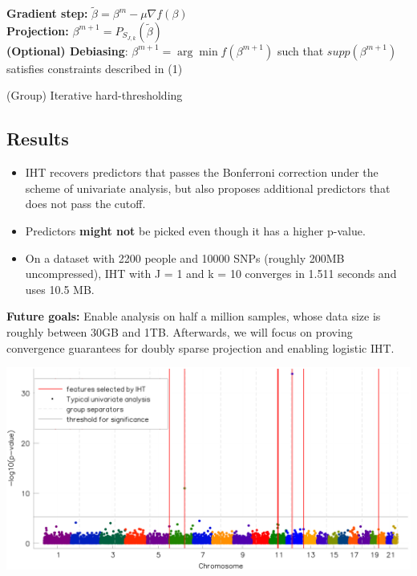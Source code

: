 \documentclass[a0,portrait]{a0poster}
\begin{document}
\begin{multicols}{2}
\begin{algorithm*}[H]
      {
        \textbf{Gradient step:} $\tilde{\beta} = \beta^m - \mu \nabla f(\beta)$\\
        \textbf{Projection:} $\beta^{m+1} = P_{S_{J, k}}(\tilde{\beta})$\\
        \textbf{(Optional) Debiasing}: $\beta^{m+1} = \arg \min f(\beta^{m+1})$ such that $supp(\beta^{m+1})$ satisfies constraints described in (1)
      }
    \caption{(Group) Iterative hard-thresholding}
\end{algorithm*}


\color{Navy}
\begin{center}
\section*{Results}
\end{center}
\color{Black}

\begin{itemize}
	\item IHT recovers predictors that passes the Bonferroni correction under the scheme of univariate analysis, but also proposes additional predictors that does not pass the cutoff.
	\item Predictors \textbf{might not} be picked even though it has a higher p-value.
	\item On a dataset with 2200 people and 10000 SNPs (roughly 200MB uncompressed), IHT with J = 1 and k = 10 converges in 1.511 seconds and uses 10.5 MB.
\end{itemize}

\vspace{1cm}

\textbf{Future goals:} Enable analysis on half a million samples, whose data size is roughly between 30GB and 1TB. Afterwards, we will focus on proving convergence guarantees for doubly sparse projection and enabling logistic IHT. 

\begin{center}\vspace{1cm}
\includegraphics[width=0.9\linewidth]{figures/gwas_1.png}
\end{center}\vspace{1cm}


\end{multicols}
\end{document}
